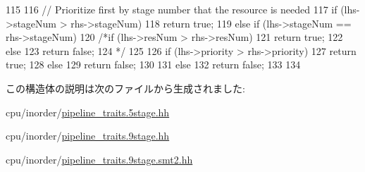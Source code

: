 \begin{DoxyCode}
115         {
116             // Prioritize first by stage number that the resource is needed
117             if (lhs->stageNum > rhs->stageNum) {
118                 return true;
119             } else if (lhs->stageNum == rhs->stageNum) {
120                 /*if (lhs->resNum > rhs->resNum) {
121                   return true;
122                 } else {
123                   return false;
124                   }*/
125 
126                 if (lhs->priority > rhs->priority) {
127                   return true;
128                 } else {
129                   return false;
130                 }
131             } else {
132                 return false;
133             }
134         }
\end{DoxyCode}


この構造体の説明は次のファイルから生成されました:\begin{DoxyCompactItemize}
\item 
cpu/inorder/\hyperlink{pipeline__traits_85stage_8hh}{pipeline\_\-traits.5stage.hh}\item 
cpu/inorder/\hyperlink{pipeline__traits_89stage_8hh}{pipeline\_\-traits.9stage.hh}\item 
cpu/inorder/\hyperlink{pipeline__traits_89stage_8smt2_8hh}{pipeline\_\-traits.9stage.smt2.hh}\end{DoxyCompactItemize}
